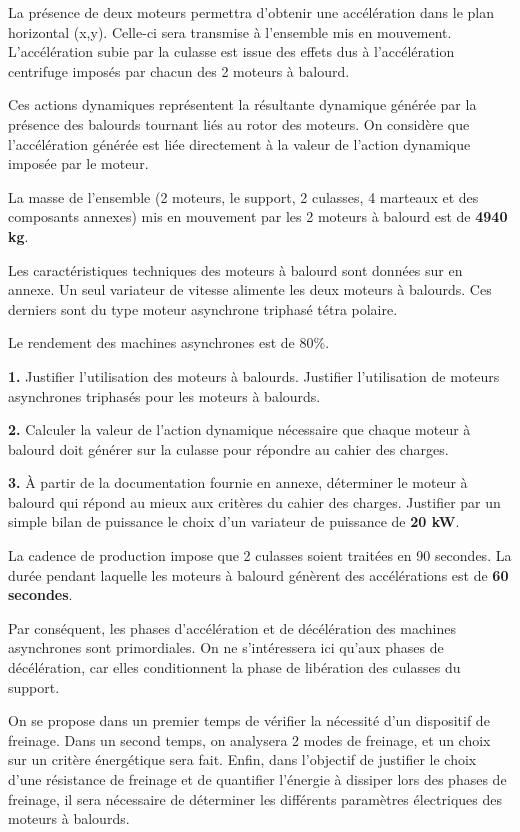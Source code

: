 La présence de deux moteurs permettra d'obtenir une accélération dans le plan horizontal (x,y). Celle-ci sera transmise à l'ensemble mis en mouvement. L'accélération subie par la culasse est issue des effets dus à l'accélération centrifuge imposés par chacun des 2 moteurs à balourd.

Ces actions dynamiques représentent la résultante dynamique générée par la présence des balourds tournant liés au rotor des moteurs. On considère que l'accélération générée est liée directement à la valeur de l'action dynamique imposée par le moteur.

La masse de l'ensemble (2 moteurs, le support, 2 culasses, 4 marteaux et des composants annexes) mis en mouvement par les 2 moteurs à balourd est de \textbf{4940 kg}.

Les caractéristiques techniques des moteurs à balourd sont données sur en annexe. Un seul variateur de vitesse alimente les deux moteurs à balourds. Ces derniers sont du type moteur asynchrone triphasé tétra polaire.

Le rendement des machines asynchrones est de 80\%.

\textbf{1.} Justifier l'utilisation des moteurs à balourds. Justifier l'utilisation de moteurs asynchrones triphasés pour les moteurs à balourds.

\textbf{2.} Calculer la valeur de l'action dynamique nécessaire que chaque moteur à balourd doit générer sur la culasse pour répondre au cahier des charges.

\textbf{3.} À partir de la documentation fournie en annexe, déterminer le moteur à balourd qui répond au mieux aux critères du cahier des charges. Justifier par un simple bilan de puissance le choix d'un variateur de puissance de \textbf{20 kW}.

La cadence de production impose que 2 culasses soient traitées en 90 secondes. La durée pendant laquelle les moteurs à balourd génèrent des accélérations est de \textbf{60 secondes}.

Par conséquent, les phases d'accélération et de décélération des machines asynchrones sont primordiales. On ne s'intéressera ici qu'aux phases de décélération, car elles conditionnent la phase de libération des culasses du support.

On se propose dans un premier temps de vérifier la nécessité d'un dispositif de freinage. Dans un second temps, on analysera 2 modes de freinage, et un choix sur un critère énergétique sera fait. Enfin, dans l'objectif de justifier le choix d'une résistance de freinage et de quantifier l'énergie à dissiper lors des phases de freinage, il sera nécessaire de déterminer les différents paramètres électriques des moteurs à balourds.

